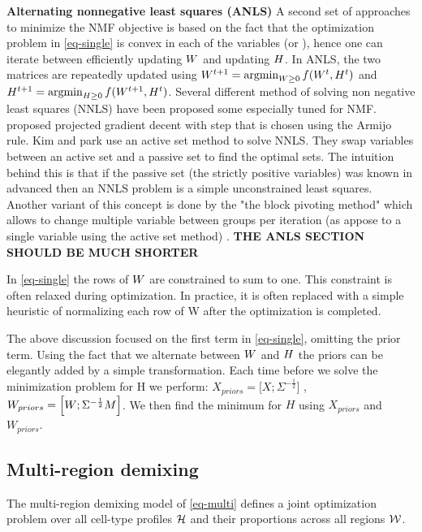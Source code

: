 {\bf{Alternating nonnegative least squares} (ANLS)} A second set of approaches to minimize the NMF objective is based on the fact that the optimization problem in \eqref{eq-single} is convex in each of the variables \W (or \Htext), hence one can iterate between efficiently updating $W$ and updating ${H}$. In ANLS, the two matrices are  repeatedly updated using $ W^{t+1} = \argmin_{W \geq 0 } f(W^t, H^t)$ and $H^{t+1} = \argmin_{H \geq 0 } f(W^{t+1},H^t)$. Several different method of solving non negative least squares (NNLS) have been proposed some especially tuned for NMF. \citet{lin2007projected} proposed projected gradient decent with step that is chosen using the Armijo rule. 
Kim and park \cite{kim2008activeset,kim2011fast} use an active set method to solve NNLS. They swap variables between an active set and a passive set to find the optimal sets. The intuition behind this is that if the passive set (the strictly positive variables) was known in advanced then an NNLS problem is a simple unconstrained least squares. Another variant of this concept is done by the "the block pivoting method" which allows to change multiple variable between groups per iteration (as appose to a single variable using the active set method) \cite{kim2011fast}. {\bf{THE ANLS SECTION SHOULD BE MUCH SHORTER}}

In \eqref{eq-single} the rows of $W$ are constrained to sum to one. This constraint is often relaxed during optimization. In practice, it is often replaced with a simple heuristic of normalizing each row of W after the optimization is completed. 

The above discussion focused on the first term in \eqref{eq-single}, omitting the prior term. Using the fact that we alternate between $W$ and ${H}$ the priors can be elegantly added by a simple transformation. Each time before we solve the minimization problem for H we perform:
$ X_{priors} = \Big[ X ;\Sigma^{-\frac{1}{2}} \Big]  $  ,  $ W_{priors} = \Big[  W ; \Sigma^{-\frac{1}{2}} M \Big]  $. We then find the minimum for $H$ using $X_{priors} $ and $W_{priors} $. 



\subsection{Multi-region demixing}
The multi-region demixing model of \eqref{eq-multi} defines a joint optimization problem over all cell-type profiles $\cal{{H}}$ and their proportions across all regions $\cal{W}$.

